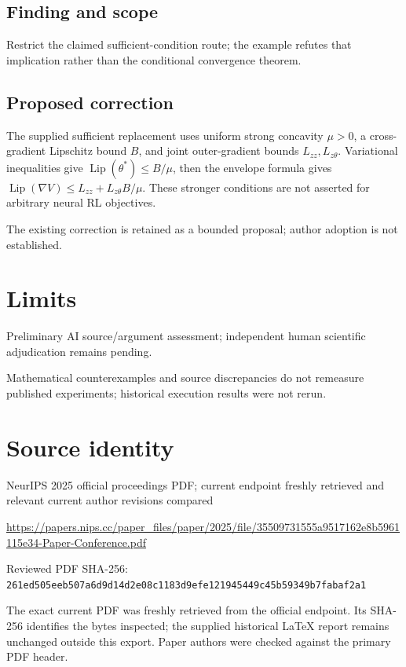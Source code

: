 \documentclass[11pt]{article}
\begin{document}
\subsection*{Finding and scope}

Restrict the claimed sufficient-condition route; the example refutes that implication rather than the conditional convergence theorem.

\subsection*{Proposed correction}

The supplied sufficient replacement uses uniform strong concavity \(\mu>0\), a cross-gradient Lipschitz bound \(B\), and joint outer-gradient bounds \(L_{zz},L_{z\theta}\). Variational inequalities give \(\operatorname{Lip}(\theta^*)\leq B/\mu\), then the envelope formula gives \(\operatorname{Lip}(\nabla V)\leq L_{zz}+L_{z\theta}B/\mu\). These stronger conditions are not asserted for arbitrary neural RL objectives.

The existing correction is retained as a bounded proposal; author adoption is not established.

\section*{Limits}

Preliminary AI source/argument assessment; independent human scientific adjudication remains pending.\par

Mathematical counterexamples and source discrepancies do not remeasure published experiments; historical execution results were not rerun.\par

\section*{Source identity}

NeurIPS 2025 official proceedings PDF; current endpoint freshly retrieved and relevant current author revisions compared

\url{https://papers.nips.cc/paper_files/paper/2025/file/35509731555a9517162e8b5961115e34-Paper-Conference.pdf}

Reviewed PDF SHA-256: \nolinkurl{261ed505eeb507a6d9d14d2e08c1183d9efe121945449c45b59349b7fabaf2a1}

The exact current PDF was freshly retrieved from the official endpoint. Its SHA-256 identifies the bytes inspected; the supplied historical LaTeX report remains unchanged outside this export. Paper authors were checked against the primary PDF header.
\end{document}
